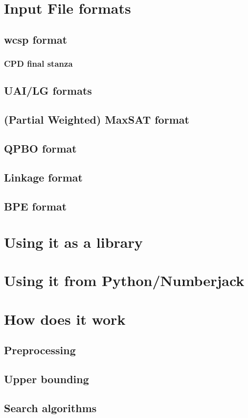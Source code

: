 \documentclass{article}
\begin{document}
\section{Input File formats}
\label{file-formats}

\subsection{wcsp format}

\subsubsection{CPD final stanza}

\subsection{UAI/LG formats}

\subsection{(Partial Weighted) MaxSAT format}

\subsection{QPBO format}

\subsection{Linkage format}

\subsection{BPE format}

\section{Using it as a library}

\section{Using it from Python/Numberjack}


\section{How does it work}

\subsection{Preprocessing}

\subsection{Upper bounding}

\subsection{Search algorithms}
\end{document}
